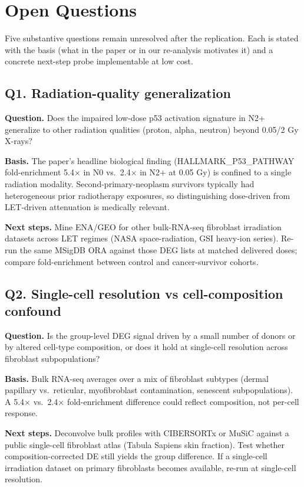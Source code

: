 \section{Open Questions}

Five substantive questions remain unresolved after the replication. Each is stated with the basis (what in the paper or in our re-analysis motivates it) and a concrete next-step probe implementable at low cost.

\subsection*{Q1. Radiation-quality generalization}
\textbf{Question.} Does the impaired low-dose p53 activation signature in N2+ generalize to other radiation qualities (proton, alpha, neutron) beyond 0.05/2 Gy X-rays?

\textbf{Basis.} The paper's headline biological finding (HALLMARK\_P53\_PATHWAY fold-enrichment 5.4$\times$ in N0 vs.\ 2.4$\times$ in N2+ at 0.05 Gy) is confined to a single radiation modality. Second-primary-neoplasm survivors typically had heterogeneous prior radiotherapy exposures, so distinguishing dose-driven from LET-driven attenuation is medically relevant.

\textbf{Next steps.} Mine ENA/GEO for other bulk-RNA-seq fibroblast irradiation datasets across LET regimes (NASA space-radiation, GSI heavy-ion series). Re-run the same MSigDB ORA against those DEG lists at matched delivered doses; compare fold-enrichment between control and cancer-survivor cohorts.

\subsection*{Q2. Single-cell resolution vs cell-composition confound}
\textbf{Question.} Is the group-level DEG signal driven by a small number of donors or by altered cell-type composition, or does it hold at single-cell resolution across fibroblast subpopulations?

\textbf{Basis.} Bulk RNA-seq averages over a mix of fibroblast subtypes (dermal papillary vs.\ reticular, myofibroblast contamination, senescent subpopulations). A 5.4$\times$ vs.\ 2.4$\times$ fold-enrichment difference could reflect composition, not per-cell response.

\textbf{Next steps.} Deconvolve bulk profiles with CIBERSORTx or MuSiC against a public single-cell fibroblast atlas (Tabula Sapiens skin fraction). Test whether composition-corrected DE still yields the group difference. If a single-cell irradiation dataset on primary fibroblasts becomes available, re-run at single-cell resolution.

